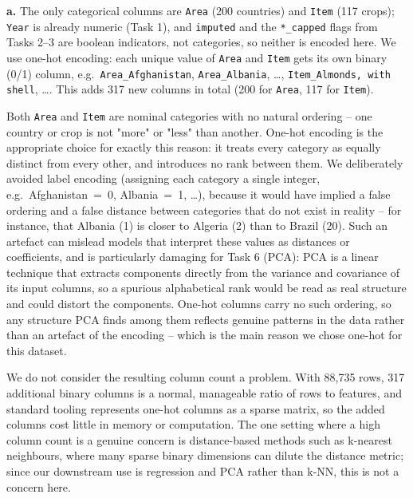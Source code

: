 
\textbf{a.}
The only categorical columns are \texttt{Area} (200 countries) and \texttt{Item} (117 crops); \texttt{Year} is already numeric (Task 1), and \texttt{imputed} and the \texttt{*\_capped} flags from Tasks 2--3 are boolean indicators, not categories, so neither is encoded here. We use one-hot encoding: each unique value of \texttt{Area} and \texttt{Item} gets its own binary (0/1) column, e.g.\ \texttt{Area\_Afghanistan}, \texttt{Area\_Albania}, \ldots, \texttt{Item\_Almonds, with shell}, \ldots. This adds 317 new columns in total (200 for \texttt{Area}, 117 for \texttt{Item}).

Both \texttt{Area} and \texttt{Item} are nominal categories with no natural ordering -- one country or crop is not "more" or "less" than another. One-hot encoding is the appropriate choice for exactly this reason: it treats every category as equally distinct from every other, and introduces no rank between them. We deliberately avoided label encoding (assigning each category a single integer, e.g.\ Afghanistan~=~0, Albania~=~1, \ldots), because it would have implied a false ordering and a false distance between categories that do not exist in reality -- for instance, that Albania (1) is closer to Algeria (2) than to Brazil (20). Such an artefact can mislead models that interpret these values as distances or coefficients, and is particularly damaging for Task 6 (PCA): PCA is a linear technique that extracts components directly from the variance and covariance of its input columns, so a spurious alphabetical rank would be read as real structure and could distort the components. One-hot columns carry no such ordering, so any structure PCA finds among them reflects genuine patterns in the data rather than an artefact of the encoding -- which is the main reason we chose one-hot for this dataset.

We do not consider the resulting column count a problem. With 88,735 rows, 317 additional binary columns is a normal, manageable ratio of rows to features, and standard tooling represents one-hot columns as a sparse matrix, so the added columns cost little in memory or computation. The one setting where a high column count is a genuine concern is distance-based methods such as k-nearest neighbours, where many sparse binary dimensions can dilute the distance metric; since our downstream use is regression and PCA rather than k-NN, this is not a concern here.

